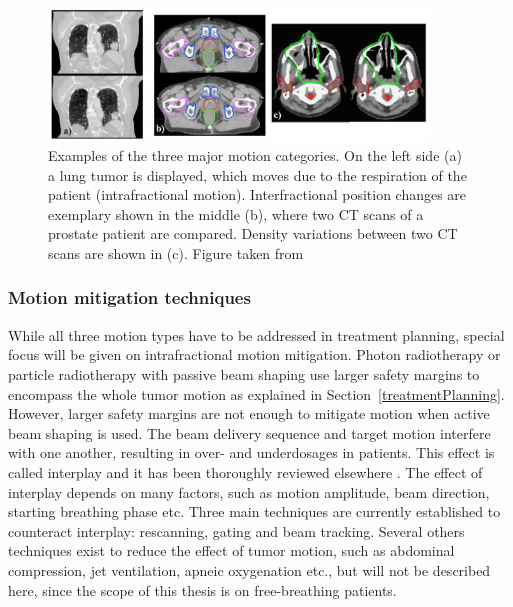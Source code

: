 \begin{figure}[H]
\begin{center}
\includegraphics[width=0.9\textwidth]{./Fundamentals/Images/motion_examples.png}
\caption{Examples of the three major motion categories. On the left side (a) a lung tumor is displayed, which moves due to the respiration 
of the patient (intrafractional motion). Interfractional position changes are exemplary shown in the middle (b), where two CT scans of a 
prostate patient are compared. Density variations between two CT scans are shown in (c). Figure taken from \cite{Engelsman2011}}
\label{motion}
\end{center}
\end{figure}

\subsubsection{Motion mitigation techniques}

While all three motion types have to be addressed in treatment planning, special focus will be given on intrafractional motion mitigation. Photon radiotherapy or particle radiotherapy with passive beam shaping 
use larger safety margins to encompass the whole tumor motion as explained in Section~\ref{treatmentPlanning}. However, larger safety margins are not enough to mitigate motion when active beam shaping is used. The beam delivery 
sequence and target motion interfere with one another, resulting in over- and underdosages in patients. This effect is called interplay and it has been thoroughly reviewed elsewhere \cite{Phillips1992,Bert2008}. The effect of interplay depends
on many factors, such as motion amplitude, beam direction, starting breathing phase etc. Three main techniques are currently established to counteract interplay: rescanning, gating and beam tracking. Several others techniques exist
to reduce the effect of tumor motion, such as abdominal compression, jet ventilation, apneic oxygenation etc., but will not be described here, since the scope of this thesis is on free-breathing patients.


